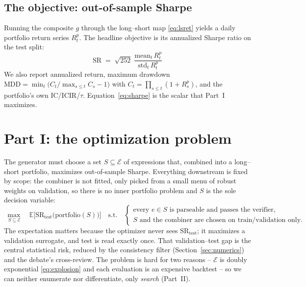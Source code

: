 \documentclass[11pt]{article}
\theoremstyle{definition}
\theoremstyle{plain}
\theoremstyle{remark}
\newcommand{\E}{\mathbb{E}}
\newcommand{\Expr}{\mathcal{E}}
\newcommand{\Sharpe}{\mathrm{SR}}
\newcommand{\IC}{\mathrm{IC}}
\newcommand{\ICIR}{\mathrm{ICIR}}
\begin{document}
\subsection{The objective: out-of-sample Sharpe}
\label{sec:sharpe}

Running the composite $g$ through the long--short map \eqref{eq:lsret} yields a daily
portfolio return series $R^p_t$. The headline objective is its annualized Sharpe ratio
on the test split:
\begin{equation}
\boxed{\ \Sharpe \;=\; \sqrt{252}\;\frac{\mathrm{mean}_t\, R^p_t}{\mathrm{std}_t\, R^p_t}\ }
\label{eq:sharpe}
\end{equation}
We also report annualized return, maximum drawdown
$\mathrm{MDD}=\min_t\big(C_t/\max_{s\le t}C_s - 1\big)$ with $C_t=\prod_{s\le t}(1+R^p_s)$,
and the portfolio's own $\IC$/$\ICIR$/$\tau$. Equation~\eqref{eq:sharpe} is the scalar
that Part~I maximizes.

\section{Part I: the optimization problem}
\label{sec:opt}

The generator must choose a set $S\subseteq\Expr$ of expressions that, combined into a
long--short portfolio, maximizes out-of-sample Sharpe. Everything downstream is fixed by scope:
the combiner is not fitted, only picked from a small menu of robust weights on validation, so
there is no inner portfolio problem and $S$ is the sole decision variable:
\begin{equation}
\boxed{\
\max_{\,S \subseteq \Expr}\quad
\E\!\big[\Sharpe_{\text{test}}\!\big(\text{portfolio}(S)\big)\big]
\quad\text{s.t.}\quad
\begin{cases}
\text{every } e\in S \text{ is parseable and passes the verifier},\\
S \text{ and the combiner are chosen on train/validation only.}
\end{cases}
\ }
\label{eq:outer}
\end{equation}
The expectation matters because the optimizer never sees $\Sharpe_{\text{test}}$; it maximizes a
validation surrogate, and test is read exactly once. That validation--test gap is the central
statistical risk, reduced by the consistency filter (Section~\ref{sec:numerics}) and the debate's
cross-review. The problem is hard for two reasons -- $\Expr$ is doubly exponential
\eqref{eq:explosion} and each evaluation is an expensive backtest -- so we can neither enumerate
nor differentiate, only \emph{search} (Part~II).
\end{document}
